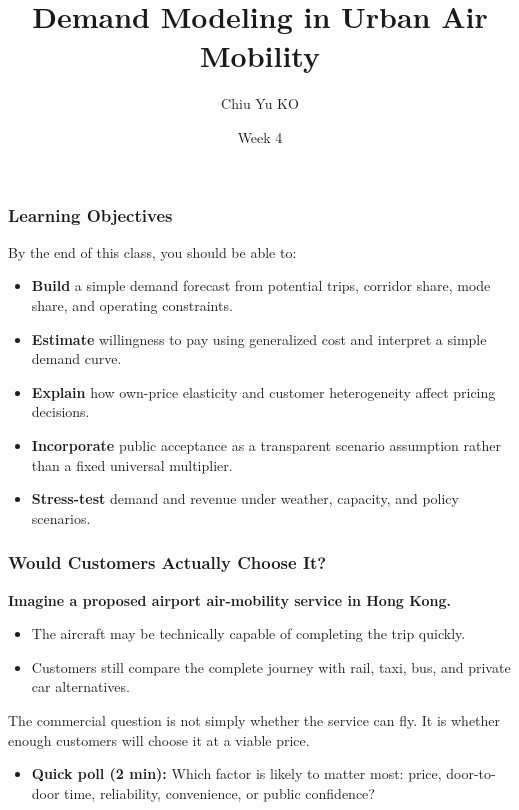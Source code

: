 \documentclass{beamer}
\begin{document}
\begin{frame}
  \title{Demand Modeling in Urban Air Mobility}
  \author{Chiu Yu KO}
  \date{Week 4}
  \titlepage
\end{frame}
\begin{frame}[t]
\frametitle{Learning Objectives}
By the end of this class, you should be able to:
\begin{itemize}
\item \textbf{Build} a simple demand forecast from potential trips, corridor share, mode share, and operating constraints.
\item \textbf{Estimate} willingness to pay using generalized cost and interpret a simple demand curve.
\item \textbf{Explain} how own-price elasticity and customer heterogeneity affect pricing decisions.
\item \textbf{Incorporate} public acceptance as a transparent scenario assumption rather than a fixed universal multiplier.
\item \textbf{Stress-test} demand and revenue under weather, capacity, and policy scenarios.
\end{itemize}
\end{frame}

\begin{frame}[t]
\frametitle{Would Customers Actually Choose It?}
\textbf{Imagine a proposed airport air-mobility service in Hong Kong.}
\begin{itemize}
\item The aircraft may be technically capable of completing the trip quickly.
\item Customers still compare the complete journey with rail, taxi, bus, and private car alternatives.
\end{itemize}
\vspace{0.3cm}
The commercial question is not simply whether the service can fly. It is whether enough customers will choose it at a viable price.
\begin{itemize}
\item \textbf{Quick poll (2 min):} Which factor is likely to matter most: price, door-to-door time, reliability, convenience, or public confidence?
\end{itemize}
\end{frame}
\end{document}

